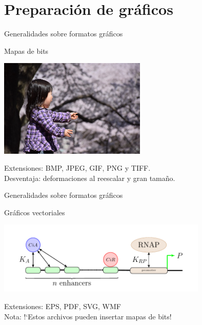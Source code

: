 \documentclass[10pt]{beamer}
\begin{document}
\section{Preparación de gráficos}
\begin{frame}{Generalidades sobre formatos gr\'aficos}
\begin{block}{Mapas de bits} 
\begin{center}
\includegraphics[width=7cm]{graficos/sorpresa.jpg}
\end{center}
Extensiones: BMP, JPEG, GIF, PNG y TIFF. \\
{\small Desventaja: deformaciones al reescalar y gran tama\~no.}
\end{block}
\end{frame}
\begin{frame}{Generalidades sobre formatos gr\'aficos}
\begin{block} {Gr\'aficos vectoriales} 
\begin{center}
\includegraphics[width=10cm]{graficos/bp2.pdf}
\end{center}
Extensiones: EPS, PDF, SVG, WMF \\
{\small Nota: !`Estos archivos pueden insertar mapas de bits! }
\end{block}
\end{frame}
\end{document}
